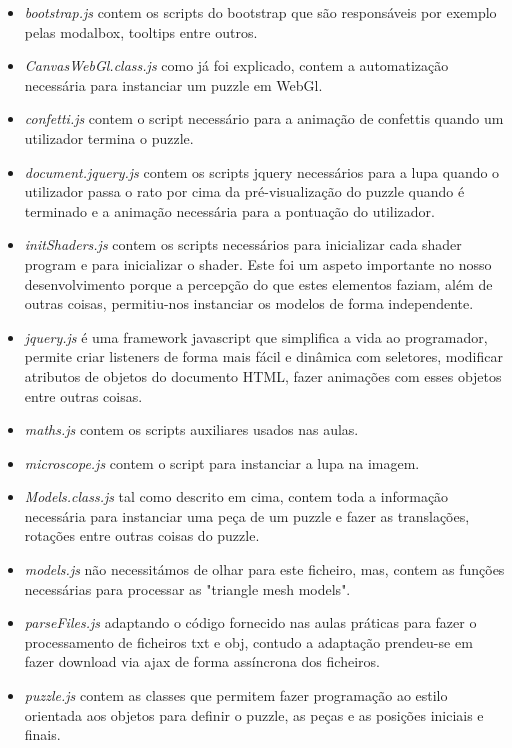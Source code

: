 \documentclass[pdftex,12pt,a4paper]{report}
\begin{document}
\begin{itemize}  
        \item \textit{bootstrap.js} contem os scripts do bootstrap que são responsáveis por exemplo pelas modalbox, tooltips entre outros.
        \item \textit{CanvasWebGl.class.js} como já foi explicado, contem a automatização necessária para instanciar um puzzle em WebGl.
        \item \textit{confetti.js} contem o script necessário para a animação de confettis quando um utilizador termina o puzzle.
        \item \textit{document.jquery.js} contem os scripts jquery necessários para a lupa quando o utilizador passa o rato por cima da pré-visualização do puzzle quando é terminado e a animação necessária para a pontuação do utilizador.
        \item \textit{initShaders.js} contem os scripts necessários para inicializar cada shader program e para inicializar o shader. Este foi um aspeto importante no nosso desenvolvimento porque a percepção do que estes elementos faziam, além de outras coisas, permitiu-nos instanciar os modelos de forma independente.
        \item \textit{jquery.js} é uma framework javascript que simplifica a vida ao programador, permite criar listeners de forma mais fácil e dinâmica com seletores, modificar atributos de objetos do documento HTML, fazer animações com esses objetos entre outras coisas.
        \item \textit{maths.js} contem os scripts auxiliares usados nas aulas.
        \item \textit{microscope.js} contem o script para instanciar a lupa na imagem.
        \item \textit{Models.class.js} tal como descrito em cima, contem toda a informação necessária para instanciar uma peça de um puzzle e fazer as translações, rotações entre outras coisas do puzzle.
        \item \textit{models.js} não necessitámos de olhar para este ficheiro, mas, contem as funções necessárias para processar as "triangle mesh models".
        \item \textit{parseFiles.js} adaptando o código fornecido nas aulas práticas para fazer o processamento de ficheiros txt e obj, contudo a adaptação prendeu-se em fazer download via ajax de forma assíncrona dos ficheiros.
        \item \textit{puzzle.js} contem as classes que permitem fazer programação ao estilo orientada aos objetos para definir o puzzle, as peças e as posições iniciais e finais.

\end{itemize}
\end{document}
